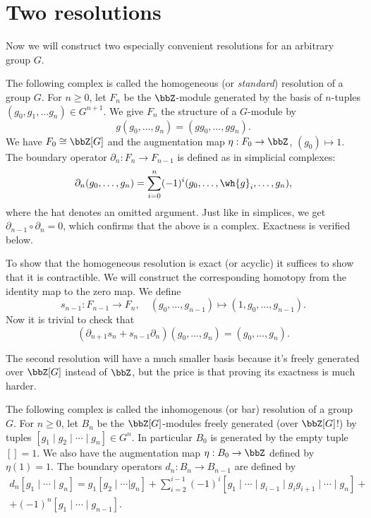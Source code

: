 \section{Two resolutions}

Now we will construct two especially convenient resolutions for an arbitrary group $G$. 

\begin{defn}
    The following complex is called the homogeneous (or \emph{standard}) resolution of a group $G$. For $n\geq 0$, let $F_n$ be the $\bbZ$-module generated by the basis of $n$-tuples $(g_0,g_1,\ldots g_n)\in G^{n+1}$. We give $F_n$ the structure of a $G$-module by
    \[g(g_0,\ldots,g_n)=(gg_0,\ldots,gg_n).\]
    We have $F_0\cong \bbZ[G]$ and the augmentation map $\eta:F_0\to \bbZ$, $(g_0)\mapsto 1$. The boundary operator $\partial_n:F_n\to F_{n-1}$ is defined as in simplicial complexes:
    \[\partial_n(g_0,\ldots,g_n)=\sum_{i=0}^n(-1)^i(g_0,\ldots,\wh{g}_i,\ldots,g_n),\]
    where the hat denotes an omitted argument. Just like in simplices, we get $\partial_{n-1}\circ \partial_n=0$, which confirms that the above is a complex. Exactness is verified below.
\end{defn}

To show that the homogeneous resolution is exact (or acyclic) it suffices to show that it is contractible. We will construct the corresponding homotopy from the identity map to the zero map. We define
\[s_{n-1}:F_{n-1}\to F_n,\quad (g_0,\ldots,g_{n-1})\mapsto (1,g_0,\ldots,g_{n-1}).\]
Now it is trivial to check that
\[(\partial_{n+1}s_n+s_{n-1}\partial_n)(g_0,\ldots,g_n)=(g_0,\ldots,g_n).\]


The second resolution will have a much smaller basis because it's freely generated over $\bbZ[G]$ instead of $\bbZ$, but the price is that proving its exactness is much harder.
\begin{defn}
    The following complex is called the inhomogenous (or bar) resolution of a group $G$. For $n\geq 0$, let $B_n$ be the $\bbZ[G]$-modules freely generated (over $\bbZ[G]$!) by tuples $[g_1\mid g_2\mid\cdots \mid g_n]\in G^n$. In particular $B_0$ is generated by the empty tuple $[]=1$. We also have the augmentation map $\eta:B_0\to\bbZ$ defined by $\eta(1)=1$. The boundary operators $d_n:B_n\to B_{n-1}$ are defined by
    \begin{multline}
        d_n[g_1\mid\cdots\mid g_n]=g_1[g_2\mid\cdots|g_n]+\sum_{i=2}^{i-1}(-1)^i[g_1\mid\cdots\mid g_{i-1}\mid g_ig_{i+1}\mid\cdots\mid g_n]+\\+(-1)^n[g_1\mid\cdots\mid g_{n-1}].
    \end{multline}
\end{defn}

